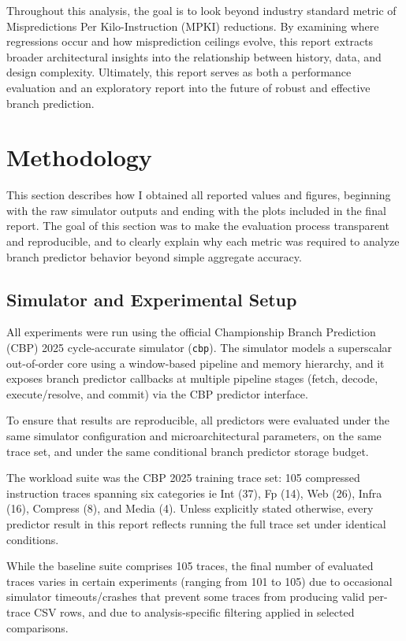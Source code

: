 \documentclass[11pt,a4paper]{article}
\begin{document}
Throughout this analysis, the goal is to look beyond industry standard metric of Mispredictions Per Kilo-Instruction (MPKI) reductions. By examining where regressions occur and how misprediction ceilings evolve, this report extracts broader architectural insights into the relationship between history, data, and design complexity. Ultimately, this report serves as both a performance evaluation and an exploratory report into the future of robust and effective branch prediction.

\newpage
\section{Methodology}

This section describes how I obtained all reported values and figures, beginning with the raw
simulator outputs and ending with the plots included in the final report. The goal of this section
was to make the evaluation process transparent and reproducible, and to clearly explain why each
metric was required to analyze branch predictor behavior beyond simple aggregate accuracy.

\subsection{Simulator and Experimental Setup}

All experiments were run using the official Championship Branch Prediction (CBP) 2025 cycle-accurate
simulator (\texttt{cbp}). The simulator models a superscalar out-of-order core using a window-based
pipeline and memory hierarchy, and it exposes branch predictor callbacks at multiple pipeline stages
(fetch, decode, execute/resolve, and commit) via the CBP predictor interface.

To ensure that results are reproducible, all predictors were evaluated under the same simulator
configuration and microarchitectural parameters, on the same trace set, and under the same conditional
branch predictor storage budget. 

The workload suite was the CBP 2025 training trace set: 105 compressed instruction traces spanning six
categories ie Int (37), Fp (14), Web (26), Infra (16), Compress (8), and Media (4). Unless explicitly
stated otherwise, every predictor result in this report reflects running the full trace set under
identical conditions.

While the baseline suite comprises 105 traces, the final number of evaluated traces varies in certain
experiments (ranging from 101 to 105) due to occasional simulator timeouts/crashes that prevent some
traces from producing valid per-trace CSV rows, and due to analysis-specific filtering
applied in selected comparisons.
\end{document}
